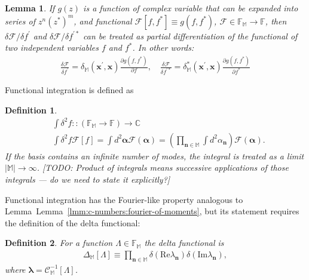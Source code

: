 \documentclass[12pt,aip,jmp,amssymb,amsmath]{revtex4-1}
\newtheorem{definition}{Definition}
\newtheorem{lemma}{Lemma}
\begin{document}
\begin{lemma}
    If $g(z)$ is a function of complex variable that can be expanded into series of $z^n (z^*)^m$, and functional $\mathcal{F}[f, f^*] \equiv g(f, f^*)$, $\mathcal{F} \in \mathbb{F}_{\mathbb{M}} \rightarrow \mathbb{F}$, then $\delta \mathcal{F} / \delta f^\prime$ and $\delta \mathcal{F} / \delta f^{\prime*}$ can be treated as partial differentiation of the functional of two independent variables $f$ and $f^*$.
    In other words:
    \begin{equation*}\begin{split}
        \frac{\delta \mathcal{F}}{\delta f^\prime}
        = \delta_{\mathbb{M}}(\boldsymbol{x}^\prime, \boldsymbol{x})
            \frac{\partial g(f, f^*)}{\partial f},
        \quad
        \frac{\delta \mathcal{F}}{\delta f^{\prime*}}
        = \delta_{\mathbb{M}}^*(\boldsymbol{x}^\prime, \boldsymbol{x})
            \frac{\partial g(f, f^*)}{\partial f^*}
    \end{split}\end{equation*}
\end{lemma}

Functional integration is defined as

\begin{definition}
    \begin{equation*}\begin{split}
        & \int \delta^2 f :: (\mathbb{F}_{\mathbb{M}} \rightarrow \mathbb{F}) \rightarrow \mathbb{C} \\
        & \int \delta^2 f \mathcal{F}[f]
        = \int d^2\boldsymbol{\alpha} \mathcal{F}(\boldsymbol{\alpha})
        = \left(
            \prod_{\boldsymbol{n} \in \mathbb{M}} \int d^2\alpha_{\boldsymbol{n}}
        \right) \mathcal{F}(\boldsymbol{\alpha}).
    \end{split}\end{equation*}
    If the basis contains an infinite number of modes, the integral is treated as a limit $|\mathbb{M}| \rightarrow \infty$.
    [TODO: Product of integrals means successive applications of those integrals --- do we need to state it explicitly?]
\end{definition}

Functional integration has the Fourier-like property analogous to Lemma~Lemma~\ref{lmm:c-numbers:fourier-of-moments}, but its statement requires the definition of the delta functional:

\begin{definition}
\label{def:func-calculus:delta-functional}
    For a function $\Lambda \in \mathbb{F}_{\mathbb{M}}$ the delta functional is
    \begin{equation*}\begin{split}
        \Delta_{\mathbb{M}}[\Lambda]
        \equiv \prod_{\boldsymbol{n} \in \mathbb{M}} \delta(\mathrm{Re} \lambda_{\boldsymbol{n}}) \delta(\mathrm{Im} \lambda_{\boldsymbol{n}}),
    \end{split}\end{equation*}
    where $\boldsymbol{\lambda} = \mathcal{C}_{\mathbb{M}}^{-1}[\Lambda]$.
\end{definition}
\end{document}
